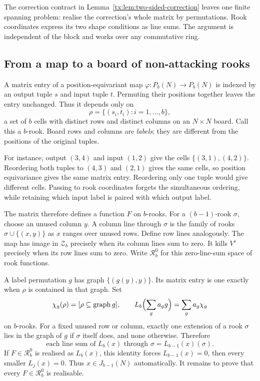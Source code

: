 The correction contract in Lemma~\ref{tx:lem:two-sided-correction} leaves one finite spanning problem: realise the correction's whole matrix by permutations. Rook coordinates express its two shape conditions as line sums. The argument is independent of the block and works over any commutative ring.

\subsection{From a map to a board of non-attacking rooks}
A matrix entry of a position-equivariant map $\varphi:P_b(N)\to P_b(N)$ is indexed by an output tuple $s$ and input tuple $t$. Permuting their positions together leaves the entry unchanged. Thus it depends only on
\[\rho=\{(s_i,t_i):i=1,\ldots,b\},
\]
a set of $b$ cells with distinct rows and distinct columns on an $N\times N$ board. Call this a $b$-rook. Board rows and columns are \emph{labels}; they are different from the positions of the original tuples.

For instance, output $(3,4)$ and input $(1,2)$ give the cells
$\{(3,1),(4,2)\}$. Reordering both tuples to $(4,3)$ and $(2,1)$
gives the same cells, so position equivariance gives the same matrix
entry. Reordering only one tuple would give different cells. Passing
to rook coordinates forgets the simultaneous ordering, while retaining
which input label is paired with which output label.

The matrix therefore defines a function $F$ on $b$-rooks. For a $(b-1)$-rook $\sigma$, choose an unused column $y$. A column line through $\sigma$ is the family of rooks $\sigma\cup\{(x,y)\}$ as $x$ ranges over unused rows. Define row lines analogously. The map has image in $\mathcal Z_b$ precisely when its column lines sum to zero. It kills $V'$ precisely when its row lines sum to zero. Write $\mathcal R_b^{0}$ for this zero-line-sum space of rook functions.

A label permutation $g$ has graph $\{(g(y),y)\}$. Its matrix entry is one exactly when $\rho$ is contained in that graph. Set
\[\chi_g(\rho)=[\rho\subseteq\operatorname{graph}g],\qquad
L_b\Bigl(\sum_ga_gg\Bigr)=\sum_ga_g\chi_g
\]
on $b$-rooks. For a fixed unused row or column, exactly one extension of a rook $\sigma$ lies in the graph of $g$ if $\sigma$ itself does, and none otherwise. Therefore
\begin{equation}\label{tx:eq:lines}
\text{each line sum of }L_b(x)\text{ through }\sigma=L_{b-1}(x)(\sigma).
\end{equation}
If $F\in \mathcal R_b^{0}$ is realised as $L_b(x)$, this identity forces $L_{b-1}(x)=0$, then every smaller $L_j(x)=0$. Thus $x\in J_{b-1}(N)$ automatically. It remains to prove that every $F\in \mathcal R_b^{0}$ is realisable.

